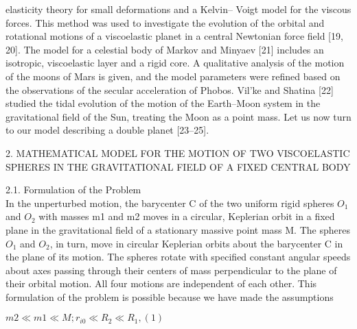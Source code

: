 \documentclass[12pt]{article}
\begin{document}
\begin{multicols}{2}
elasticity theory for small deformations and a Kelvin–
Voigt model for the viscous forces. This method
was used to investigate the evolution of the orbital
and rotational motions of a viscoelastic planet in a
central Newtonian force field [19, 20]. The model for a
celestial body of Markov and Minyaev [21] includes
an isotropic, viscoelastic layer and a rigid core. A
qualitative analysis of the motion of the moons of
Mars is given, and the model parameters were refined
based on the observations of the secular acceleration
of Phobos. Vil’ke and Shatina [22] studied the tidal
evolution of the motion of the Earth–Moon system in
the gravitational field of the Sun, treating the Moon
as a point mass.
Let us now turn to our model describing a double
planet [23–25].
\begin{center}
 2. MATHEMATICAL MODEL
FOR THE MOTION OF TWO VISCOELASTIC
SPHERES IN THE GRAVITATIONAL FIELD
OF A FIXED CENTRAL BODY
\end{center}
2.1. Formulation of the Problem\\
In the unperturbed motion, the barycenter C of the
two uniform rigid spheres $O_{1}$  and $O_{2}$ with masses m1
and m2 moves in a circular, Keplerian orbit in a fixed
plane in the gravitational field of a stationary massive
point mass M. The spheres $O_{1}$ and $O_{2}$, in turn,
move in circular Keplerian orbits about the barycenter
C in the plane of its motion. The spheres rotate
with specified constant angular speeds about axes
passing through their centers of mass perpendicular
to the plane of their orbital motion. All four motions
are independent of each other. This formulation of
the problem is possible because we have made the
assumptions

$m2 \ll m1 \ll M; r_{i0} \ll  R_{2} \ll R_{1}, (1) $


\end{multicols}
\end{document}
